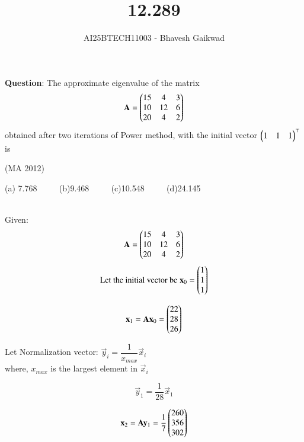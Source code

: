 \documentclass[journal]{IEEEtran}
\begin{document}

\vspace{3cm}

\title{12.289}
\author{AI25BTECH11003 - Bhavesh Gaikwad}
{\let\newpage\relax\maketitle}

\renewcommand{\thefigure}{\theenumi}
\renewcommand{\thetable}{\theenumi}
\setlength{\intextsep}{10pt} 

\renewcommand{\thetable}{\theenumi}


\textbf{Question}: The approximate eigenvalue of the matrix 
$$\mathbf{A} = \begin{pmatrix}15 & 4 & 3 \\ 10 & 12 & 6 \\ 20 & 4 & 2\end{pmatrix}$$
obtained after two iterations of Power method, with the initial vector $\begin{pmatrix}1 & 1 & 1\end{pmatrix}^\top$ is 

\hfill{(MA 2012)}

(a) 7.768 $\qquad$ (b)9.468 $\qquad$ (c)10.548 $\qquad$ (d)24.145
\bigskip
 
\solution \\
Given: 
$$\mathbf{A} = \begin{pmatrix}15 & 4 & 3 \\ 10 & 12 & 6 \\ 20 & 4 & 2\end{pmatrix}$$
$$\text{Let the initial vector be} \; \mathbf{x}_0 = \begin{pmatrix}1 \\ 1 \\ 1\end{pmatrix}$$

\begin{equation}
\mathbf{x}_{1} = \mathbf{A}\mathbf{x}_0 = \begin{pmatrix}22 \\ 28 \\ 26\end{pmatrix}    
\end{equation}


Let Normalization vector: $\vec{y}_i = \dfrac{1}{x_{max}}\vec{x}_i$\\
where, $x_{max}$ is the largest element in $\vec{x}_i$

\begin{equation}
\vec{y}_1 = \frac{1}{28}\vec{x}_1   
\end{equation}

\begin{equation}
\mathbf{x}_2 = \mathbf{A}\mathbf{y}_1 = \frac{1}{7}\begin{pmatrix}260 \\ 356 \\ 302\end{pmatrix} 
\end{equation}
\end{document}
